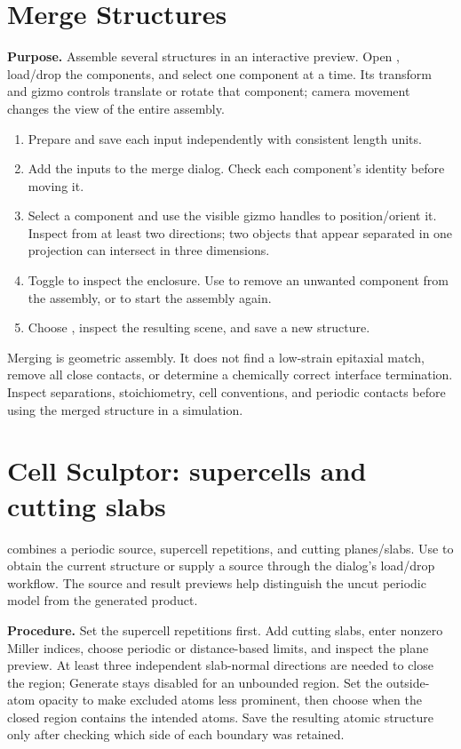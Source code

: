 \section{Merge Structures}
\textbf{Purpose.} Assemble several structures in an interactive preview. Open , load/drop the components, and select one component at a time. Its transform and gizmo controls translate or rotate that component; camera movement changes the view of the entire assembly.

\begin{enumerate}
\item Prepare and save each input independently with consistent length units.
\item Add the inputs to the merge dialog. Check each component's identity before moving it.
\item Select a component and use the visible gizmo handles to position/orient it. Inspect from at least two directions; two objects that appear separated in one projection can intersect in three dimensions.
\item Toggle  to inspect the enclosure. Use  to remove an unwanted component from the assembly, or  to start the assembly again.
\item Choose , inspect the resulting scene, and save a new structure.
\end{enumerate}
Merging is geometric assembly. It does not find a low-strain epitaxial match, remove all close contacts, or determine a chemically correct interface termination. Inspect separations, stoichiometry, cell conventions, and periodic contacts before using the merged structure in a simulation.

\section{Cell Sculptor: supercells and cutting slabs}
 combines a periodic source, supercell repetitions, and cutting planes/slabs. Use  to obtain the current structure or supply a source through the dialog's load/drop workflow. The source and result previews help distinguish the uncut periodic model from the generated product.

\textbf{Procedure.} Set the supercell repetitions first. Add cutting slabs, enter nonzero Miller indices, choose periodic or distance-based limits, and inspect the plane preview. At least three independent slab-normal directions are needed to close the region; Generate stays disabled for an unbounded region. Set the outside-atom opacity to make excluded atoms less prominent, then choose  when the closed region contains the intended atoms. Save the resulting atomic structure only after checking which side of each boundary was retained.

